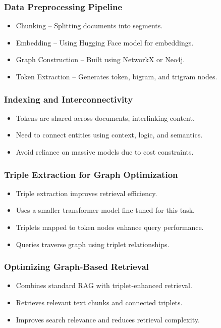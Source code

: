 \begin{frame}[fragile]\frametitle{Data Preprocessing Pipeline}
    \begin{itemize}
        \item Chunking – Splitting documents into segments.
        \item Embedding – Using Hugging Face model for embeddings.
        \item Graph Construction – Built using NetworkX or Neo4j.
        \item Token Extraction – Generates token, bigram, and trigram nodes.
    \end{itemize}
\end{frame}

\begin{frame}[fragile]\frametitle{Indexing and Interconnectivity}
    \begin{itemize}
        \item Tokens are shared across documents, interlinking content.
        \item Need to connect entities using context, logic, and semantics.
        \item Avoid reliance on massive models due to cost constraints.
    \end{itemize}
\end{frame}

\begin{frame}[fragile]\frametitle{Triple Extraction for Graph Optimization}
    \begin{itemize}
        \item Triple extraction improves retrieval efficiency.
        \item Uses a smaller transformer model fine-tuned for this task.
        \item Triplets mapped to token nodes enhance query performance.
        \item Queries traverse graph using triplet relationships.
    \end{itemize}
\end{frame}

\begin{frame}[fragile]\frametitle{Optimizing Graph-Based Retrieval}
    \begin{itemize}
        \item Combines standard RAG with triplet-enhanced retrieval.
        \item Retrieves relevant text chunks and connected triplets.
        \item Improves search relevance and reduces retrieval complexity.
    \end{itemize}
\end{frame}

